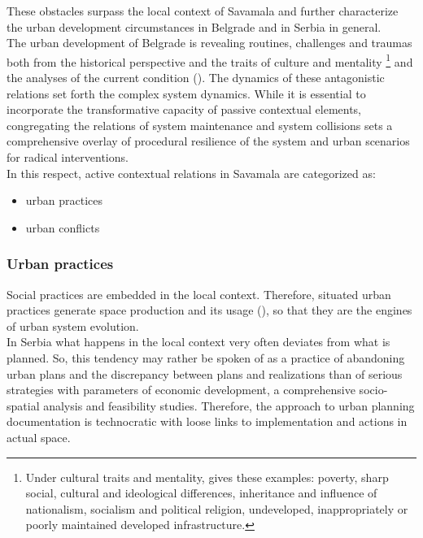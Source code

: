 \documentclass[11pt]{report}
\begin{document}
These obstacles surpass the local context of Savamala and further characterize the urban development circumstances in Belgrade and in Serbia in general.
\\

The  urban  development  of  Belgrade  is  revealing  routines, challenges  and  traumas both from the historical perspective and the traits of culture and mentality
\footnote{Under cultural traits and mentality, \href{Samardzic}{\cite{doytchinov_belgrade_2015}} gives these examples: poverty, sharp social, cultural and ideological differences, inheritance and influence of nationalism, socialism and political religion, undeveloped, inappropriately or poorly maintained developed infrastructure.}
and the analyses of the current condition (\href{ref}{\citealt{doytchinov_belgrade_2015}}). 
The dynamics of these antagonistic relations set forth the complex system dynamics.
While it is essential to incorporate the transformative capacity of passive contextual elements, congregating the relations of system maintenance and system collisions sets a comprehensive overlay of procedural resilience of the system and urban scenarios for radical interventions.
\\

In this respect, active contextual relations in Savamala are categorized as:

\begin{itemize}
\item urban practices
\item urban conflicts
\end{itemize}

\subsubsection{Urban practices}

Social practices are embedded in the local context. Therefore, situated urban practices generate space production and its usage (\href{ref}{\citealt{de_holanda_exceptional_2011}}), so that they are the engines of urban system evolution. %
\\

In Serbia what happens in the local context very often deviates from what is planned. So, this tendency may rather be spoken of as a practice of abandoning urban plans and the discrepancy between plans and realizations than of serious strategies with parameters of economic development, a comprehensive socio-spatial analysis and feasibility studies. Therefore, the approach to urban planning documentation is technocratic with loose links to implementation and actions in actual space.
\\
\end{document}

